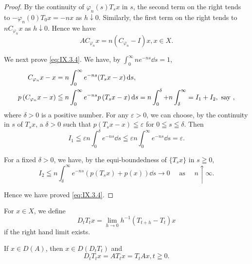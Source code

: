 \begin{proof}
By the continuity of $\varphi_{n}(s) T_{s}x$ in $s$, the second term on the right tends to $-\varphi_{n}(0) T_{0}x = -nx$ as $h \downarrow 0$. Similarly, the first term on the right tends to $nC_{\varphi_n}x$ as $h \downarrow 0$. Hence we have 
\begin{equation}\label{eq:IX.3.5}
A C _ {\varphi_{n}} x = n \left(C _ {\varphi_{n}} - I\right) x, x \in X.
\end{equation}

We next prove \eqref{eq:IX.3.4}. We have, by $\int_0^\infty ne^{-ns}\dd s = 1$, 
\begin{align}
C _ {\varphi_{n}} x - x& = n \int_{0} ^{\infty} e ^{-ns} (T _{s} x - x) \mathop{}\!\mathrm{d} s, \notag \\
p \left(C _ {\varphi_{n}} x - x\right)& \leqq n \int_{0} ^{\infty} e ^{-ns} p \left(T _{s} x - x\right) \mathop{}\!\mathrm{d} s = n \int_{0} ^{\delta} + n \int_{\delta} ^{\infty} = I _{1} + I _{2}, \text{ say }, \notag
\end{align}
where $\delta > 0$ is a positive number. For any $\varepsilon > 0$, we can choose, by the continuity in $s$ of $T_s x$, a $\delta > 0$ such that $p(T_s x - x) \leqq \varepsilon$ for $0 \leqq s \leqq \delta$. Then 
\[
I _{1} \leqq \varepsilon n \int_{0} ^{\delta} e ^{-ns} \dd s \leqq \varepsilon n \int_{0} ^{\infty} e ^{-ns} \dd s = \varepsilon .
\]

For a fixed $\delta > 0$, we have, by the equi-boundedness of $\{T_s x\}$ in $s \geqq 0$, 
\[
I _{2} \leqq n \int_{\delta} ^{\infty} e ^{-ns} (p (T _{s} x) + p (x)) \dd s \rightarrow 0 \quad \text{ as } \quad n \uparrow \infty .
\]

Hence we have proved \eqref{eq:IX.3.4}.
\end{proof}

\begin{definitionu} For $x \in X$, we define 
\begin{equation}\label{eq:IX.3.6}
D _{t} T _{t} x = \lim\limits _{h \rightarrow 0} h ^{-1} (T _{t+h} - T _{t}) x
\end{equation}
if the right hand limit exists. 
\end{definitionu}

\begin{theorem}\label{thm:IX.3.Theorem.2} If $x \in D(A)$, then $x \in D(D_t T_t)$ and 
\begin{equation}\label{eq:IX.3.7}
D _{t} T _{t} x = A T _{t} x = T _{t} A x, t \geqq 0.
\end{equation}
\end{theorem}

